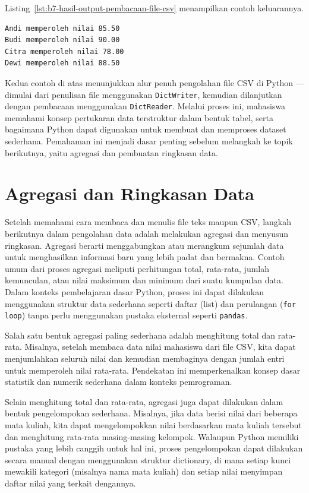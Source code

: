 Listing~\ref{lst:b7-hasil-output-pembacaan-file-csv} menampilkan contoh keluarannya.

\begin{lstlisting}[language=bash, caption={Hasil output pembacaan file CSV}, label={lst:b7-hasil-output-pembacaan-file-csv}]
Andi memperoleh nilai 85.50
Budi memperoleh nilai 90.00
Citra memperoleh nilai 78.00
Dewi memperoleh nilai 88.50
\end{lstlisting}

Kedua contoh di atas menunjukkan alur penuh pengolahan file CSV di Python — dimulai dari penulisan file menggunakan \texttt{DictWriter}, kemudian dilanjutkan dengan pembacaan menggunakan \texttt{DictReader}.  
Melalui proses ini, mahasiswa memahami konsep pertukaran data terstruktur dalam bentuk tabel, serta bagaimana Python dapat digunakan untuk membuat dan memproses dataset sederhana.  
Pemahaman ini menjadi dasar penting sebelum melangkah ke topik berikutnya, yaitu agregasi dan pembuatan ringkasan data.



\section{Agregasi dan Ringkasan Data}

Setelah memahami cara membaca dan menulis file teks maupun CSV, langkah berikutnya dalam pengolahan data adalah melakukan agregasi dan menyusun ringkasan. Agregasi berarti menggabungkan atau merangkum sejumlah data untuk menghasilkan informasi baru yang lebih padat dan bermakna. Contoh umum dari proses agregasi meliputi perhitungan total, rata-rata, jumlah kemunculan, atau nilai maksimum dan minimum dari suatu kumpulan data. Dalam konteks pembelajaran dasar Python, proses ini dapat dilakukan menggunakan struktur data sederhana seperti daftar (list) dan perulangan (\texttt{for loop}) tanpa perlu menggunakan pustaka eksternal seperti \texttt{pandas}.

Salah satu bentuk agregasi paling sederhana adalah menghitung total dan rata-rata. Misalnya, setelah membaca data nilai mahasiswa dari file CSV, kita dapat menjumlahkan seluruh nilai dan kemudian membaginya dengan jumlah entri untuk memperoleh nilai rata-rata. Pendekatan ini memperkenalkan konsep dasar statistik dan numerik sederhana dalam konteks pemrograman.

Selain menghitung total dan rata-rata, agregasi juga dapat dilakukan dalam bentuk pengelompokan sederhana. Misalnya, jika data berisi nilai dari beberapa mata kuliah, kita dapat mengelompokkan nilai berdasarkan mata kuliah tersebut dan menghitung rata-rata masing-masing kelompok. Walaupun Python memiliki pustaka yang lebih canggih untuk hal ini, proses pengelompokan dapat dilakukan secara manual dengan menggunakan struktur dictionary, di mana setiap kunci mewakili kategori (misalnya nama mata kuliah) dan setiap nilai menyimpan daftar nilai yang terkait dengannya.

